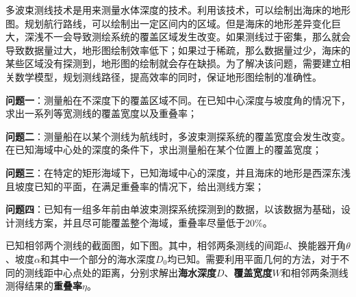 \setcounter{page}{1}




多波束测线技术是用来测量水体深度的技术。利用该技术，可以绘制出海床的地形图。规划航行路线，可以绘制出一定区间内的区域。但是海床的地形差异变化巨大，深浅不一会导致测绘系统的覆盖区域发生改变。如果测线过于密集，那么就会导致数据量过大，地形图绘制效率低下；如果过于稀疏，那么数据量过少，海床的某些区域没有探测到，地形图的绘制就会存在缺损。为了解决该问题，需要建立相关数学模型，规划测线路径，提高效率的同时，保证地形图绘制的准确性。


\textbf{问题一}：测量船在不深度下的覆盖区域不同。在已知中心深度与坡度角的情况下，求出一系列等宽测线的覆盖宽度以及重叠率；

\textbf{问题二}：测量船在以某个测线为航线时，多波束测探系统的覆盖宽度会发生改变。在已知海域中心处的深度的条件下，求出测量船在某个位置上的覆盖宽度；

\textbf{问题三}：在特定的矩形海域下，已知海域中心的深度，并且海床的地形是西深东浅且坡度已知的平面，在满足重叠率的情况下，给出测线方案；

\textbf{问题四}：已知有一组多年前由单波束测探系统探测到的数据，以该数据为基础，设计测线方案，并且尽可能覆盖整个海域，重叠率尽量低于$20\%$。



\quad\newline
{}


已知相邻两个测线的截面图，如下图。其中，相邻两条测线的间距$d$、换能器开角$\theta$、坡度$\alpha$和其中一个部分的海水深度$D_0$均已知。需要利用平面几何的方法，对于不同的测线距中心点处的距离，分别求解出\textbf{海水深度}$D$、\textbf{覆盖宽度}$W$和相邻两条测线测得结果的\textbf{重叠率}$\eta$。

